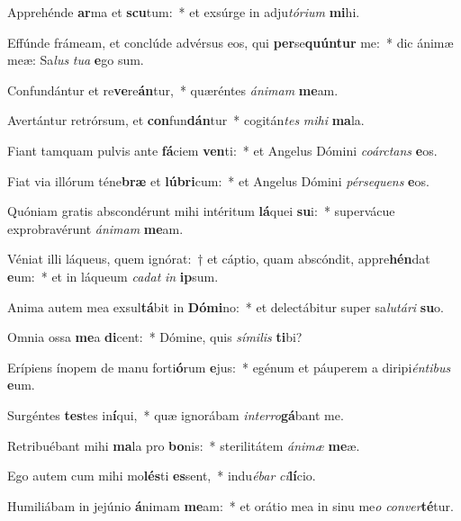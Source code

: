 \item Apprehénde \textbf{ar}ma et \textbf{scu}tum:~* et exsúrge in adju\textit{tó}\textit{ri}\textit{um} \textbf{mi}hi.
\item Effúnde frámeam, et conclúde advérsus eos, qui \textbf{per}se\textbf{quún}\textbf{tur} me:~* dic ánimæ meæ: Sa\textit{lus} \textit{tu}\textit{a} \textbf{e}go sum.
\item Confundántur et re\textbf{ve}re\textbf{án}tur,~* quæréntes \textit{á}\textit{ni}\textit{mam} \textbf{me}am.
\item Avertántur retrórsum, et \textbf{con}fun\textbf{dán}tur~* cogitán\textit{tes} \textit{mi}\textit{hi} \textbf{ma}la.
\item Fiant tamquam pulvis ante \textbf{fá}ciem \textbf{ven}ti:~* et Angelus Dómini \textit{co}\textit{árc}\textit{tans} \textbf{e}os.
\item Fiat via illórum téne\textbf{bræ} et \textbf{lú}\textbf{bri}cum:~* et Angelus Dómini \textit{pér}\textit{se}\textit{quens} \textbf{e}os.
\item Quóniam gratis abscondérunt mihi intéritum \textbf{lá}quei \textbf{su}i:~* supervácue exprobravérunt \textit{á}\textit{ni}\textit{mam} \textbf{me}am.
\item Véniat illi láqueus, quem ignórat:~† et cáptio, quam abscóndit, appre\textbf{hén}dat \textbf{e}um:~* et in láqueum \textit{ca}\textit{dat} \textit{in} \textbf{ip}sum.
\item Anima autem mea exsul\textbf{tá}bit in \textbf{Dó}\textbf{mi}no:~* et delectábitur super sa\textit{lu}\textit{tá}\textit{ri} \textbf{su}o.
\item Omnia ossa \textbf{me}a \textbf{di}cent:~* Dómine, quis \textit{sí}\textit{mi}\textit{lis} \textbf{ti}bi?
\item Erípiens ínopem de manu forti\textbf{ó}rum \textbf{e}jus:~* egénum et páuperem a diripi\textit{én}\textit{ti}\textit{bus} \textbf{e}um.
\item Surgéntes \textbf{tes}tes in\textbf{í}qui,~* quæ ignorábam \textit{in}\textit{ter}\textit{ro}\textbf{gá}bant me.
\item Retribuébant mihi \textbf{ma}la pro \textbf{bo}nis:~* sterilitátem \textit{á}\textit{ni}\textit{mæ} \textbf{me}æ.
\item Ego autem cum mihi mo\textbf{lés}ti \textbf{es}sent,~* indu\textit{é}\textit{bar} \textit{ci}\textbf{lí}cio.
\item Humiliábam in jejúnio \textbf{á}nimam \textbf{me}am:~* et orátio mea in sinu me\textit{o} \textit{con}\textit{ver}\textbf{té}tur.
